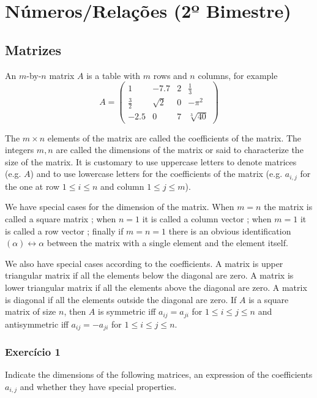 \chapter{Números/Relações (2º Bimestre)}

\section{Matrizes}

An $m$-by-$n$ matrix $A$ is a table with $m$ rows and $n$ columns, for
example
    $$
    A = \begin{pmatrix}
       1 & -7.7 & 2 & \frac{1}{3} \\
       \frac{3}{2} & \sqrt{2} & 0 & -\pi^2 \\
       -2.5 & 0 & 7 & \sqrt[3]{40}
    \end{pmatrix}
    $$

The $m \times n$ elements of the matrix are called the coefficients of the
matrix. The integers $m,n$ are called the dimensions of the matrix or said to
characterize the size of the matrix. It is customary to use uppercase letters
to denote matrices (e.g. $A$) and to use lowercase letters for the coefficients
of the matrix (e.g. $a_{i,j}$ for the one at row $1 \leq i \leq n$ and column
$1 \leq j \leq m$).

We have special cases for the dimension of the matrix.
When $m = n$ the matrix is called a square matrix ;
when $n = 1$ it is called a column vector ; when $m = 1$ it is called a row
vector ; finally if $m = n = 1$ there is an obvious identification
$(\alpha) \leftrightarrow \alpha$ between the matrix with a single element and
the element itself.

We also have special cases according to the coefficients.
A matrix is upper triangular matrix if all the elements below the diagonal are
zero. A matrix is lower triangular matrix if all the elements above the diagonal
are zero. A matrix is diagonal if all the elements outside the diagonal are
zero. If $A$ is a square matrix of size $n$, then $A$ is symmetric iff
$a_{ij} = a_{ji}$ for $1 \leq i \leq j \leq n$ and antisymmetric iff
$a_{ij} = -a_{ji}$ for $1 \leq i \leq j \leq n$.

\subsection*{Exercício 1}

Indicate the dimensions of the following matrices, an expression of the
coefficients $a_{i,j}$ and whether they have special properties.

